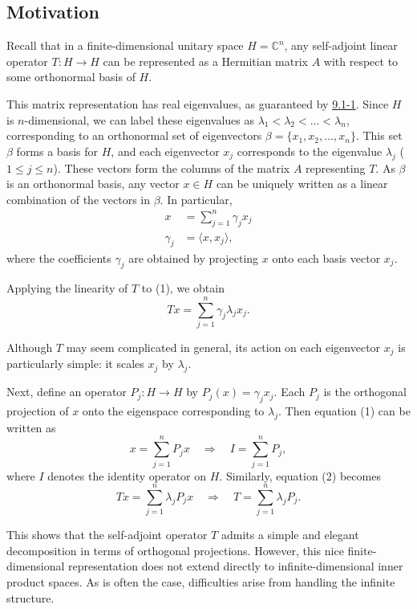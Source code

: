 \subsection{Motivation}

Recall that in a finite-dimensional unitary space \( H = \mathbb{C}^n \), any self-adjoint linear operator \( T: H \to H \) can be represented as a Hermitian matrix \( A \) with respect to some orthonormal basis of \( H \).

This matrix representation has real eigenvalues, as guaranteed by {\hyperref[9.1-1]{9.1-1}}. Since \( H \) is \( n \)-dimensional, we can label these eigenvalues as \( \lambda_1 < \lambda_2 < \dots < \lambda_n \), corresponding to an orthonormal set of eigenvectors \( \beta = \{ x_1, x_2, \dots, x_n \} \). This set \( \beta \) forms a basis for \( H \), and each eigenvector \( x_j \) corresponds to the eigenvalue \( \lambda_j \) (\( 1 \leq j \leq n \)). These vectors form the columns of the matrix \( A \) representing \( T \). As \( \beta \) is an orthonormal basis, any vector \( x \in H \) can be uniquely written as a linear combination of the vectors in \( \beta \). In particular,
\begin{align*}
    x &= \sum_{j=1}^n \gamma_j x_j \tag{1} \\
    \gamma_j &= \langle x, x_j \rangle,
\end{align*}
where the coefficients \( \gamma_j \) are obtained by projecting \( x \) onto each basis vector \( x_j \).

Applying the linearity of \( T \) to (1), we obtain
\[
    Tx = \sum_{j=1}^n \gamma_j \lambda_j x_j. \tag{2}
\]

Although \( T \) may seem complicated in general, its action on each eigenvector \( x_j \) is particularly simple: it scales \( x_j \) by \( \lambda_j \).

Next, define an operator \( P_j: H \to H \) by \( P_j(x) = \gamma_j x_j \). Each \( P_j \) is the orthogonal projection of \( x \) onto the eigenspace corresponding to \( \lambda_j \). Then equation (1) can be written as
\[
    x = \sum_{j=1}^n P_j x \quad \Rightarrow \quad I = \sum_{j=1}^n P_j, \tag{3}
\]
where \( I \) denotes the identity operator on \( H \). Similarly, equation (2) becomes
\[
    Tx = \sum_{j=1}^n \lambda_j P_j x \quad \Rightarrow \quad T = \sum_{j=1}^n \lambda_j P_j. \tag{4}
\]

This shows that the self-adjoint operator \( T \) admits a simple and elegant decomposition in terms of orthogonal projections. However, this nice finite-dimensional representation does not extend directly to infinite-dimensional inner product spaces. As is often the case, difficulties arise from handling the infinite structure.

